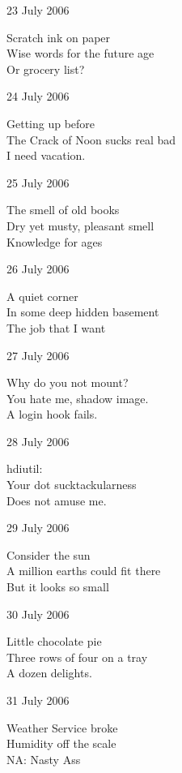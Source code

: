 \documentclass[12pt]{article}
\begin{document}
23 July 2006

Scratch ink on paper \\
Wise words for the future age \\
Or grocery list?

24 July 2006

Getting up before \\
The Crack of Noon sucks real bad \\
I need vacation.

25 July 2006

The smell of old books \\
Dry yet musty, pleasant smell \\
Knowledge for ages

\newpage

26 July 2006

A quiet corner \\
In some deep hidden basement \\
The job that I want

27 July 2006

Why do you not mount? \\
You hate me, shadow image. \\
A login hook fails.

28 July 2006

hdiutil: \\
Your dot sucktackularness \\
Does not amuse me.

29 July 2006

Consider the sun \\
A million earths could fit there \\
But it looks so small

30 July 2006

Little chocolate pie \\
Three rows of four on a tray \\
A dozen delights.

31 July 2006

Weather Service broke \\
Humidity off the scale \\
NA: Nasty Ass


\newpage
\end{document}
